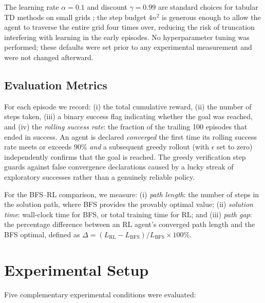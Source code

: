 \documentclass[11pt]{article}
\begin{document}
The learning rate $\alpha = 0.1$ and discount $\gamma = 0.99$ are
standard choices for tabular TD methods on small grids \cite{sutton2018};
the step budget $4n^2$ is generous enough to allow the agent to traverse
the entire grid four times over, reducing the risk of truncation
interfering with learning in the early episodes. No hyperparameter tuning
was performed; these defaults were set prior to any experimental
measurement and were not changed afterward.

\subsection{Evaluation Metrics}

For each episode we record: (i) the total cumulative reward, (ii) the
number of steps taken, (iii) a binary success flag indicating whether the
goal was reached, and (iv) the \emph{rolling success rate}: the fraction
of the trailing 100 episodes that ended in success. An agent is declared
\emph{converged} the first time its rolling success rate meets or exceeds
90\% \emph{and} a subsequent greedy rollout (with $\epsilon$ set to zero)
independently confirms that the goal is reached. The greedy verification
step guards against false convergence declarations caused by a lucky streak
of exploratory successes rather than a genuinely reliable policy.

For the BFS--RL comparison, we measure: (i) \emph{path length}: the
number of steps in the solution path, where BFS provides the provably
optimal value; (ii) \emph{solution time}: wall-clock time for BFS, or
total training time for RL; and (iii) \emph{path gap}: the percentage
difference between an RL agent's converged path length and the BFS
optimal, defined as $\Delta = (L_\text{RL} - L_\text{BFS}) /
L_\text{BFS} \times 100\%$.

\section{Experimental Setup}

Five complementary experimental conditions were evaluated:
\end{document}
